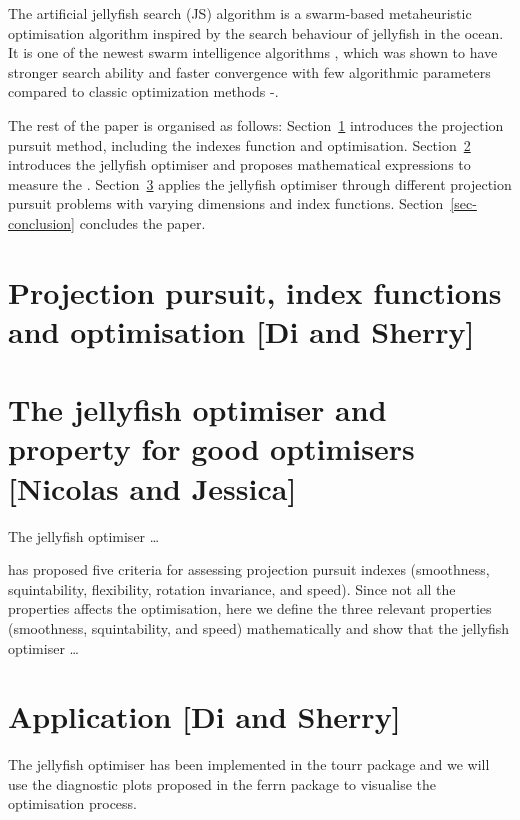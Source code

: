 \documentclass[
  number,
  preprint,
  3p]{elsarticle}
\begin{document}
The artificial jellyfish search (JS) algorithm \citep{chou_novel_2021}
is a swarm-based metaheuristic optimisation algorithm inspired by the
search behaviour of jellyfish in the ocean. It is one of the newest
swarm intelligence algorithms \citep{rajwar_exhaustive_2023}, which was
shown to have stronger search ability and faster convergence with few
algorithmic parameters compared to classic optimization methods
\citep{chou_novel_2021}-\citep{chou_recent_2022}.

The rest of the paper is organised as follows:
Section~\ref{sec-background} introduces the projection pursuit method,
including the indexes function and optimisation.
Section~\ref{sec-theory} introduces the jellyfish optimiser and proposes
mathematical expressions to measure the . Section~\ref{sec-simulation}
applies the jellyfish optimiser through different projection pursuit
problems with varying dimensions and index functions.
Section~\ref{sec-conclusion} concludes the paper.

\hypertarget{sec-background}{%
\section{Projection pursuit, index functions and optimisation {[}Di and
Sherry{]}}\label{sec-background}}

\hypertarget{sec-theory}{%
\section{The jellyfish optimiser and property for good optimisers
{[}Nicolas and Jessica{]}}\label{sec-theory}}

The jellyfish optimiser \citep{chou_novel_2021} \ldots{}

\citet{laa_using_2020} has proposed five criteria for assessing
projection pursuit indexes (smoothness, squintability, flexibility,
rotation invariance, and speed). Since not all the properties affects
the optimisation, here we define the three relevant properties
(smoothness, squintability, and speed) mathematically and show that the
jellyfish optimiser \ldots{}

\hypertarget{sec-simulation}{%
\section{Application {[}Di and Sherry{]}}\label{sec-simulation}}

The jellyfish optimiser has been implemented in the tourr package
\citep{wickham_tourr_2011} and we will use the diagnostic plots proposed
in the ferrn package \citep{RJ-2021-105} to visualise the optimisation
process.
\end{document}
